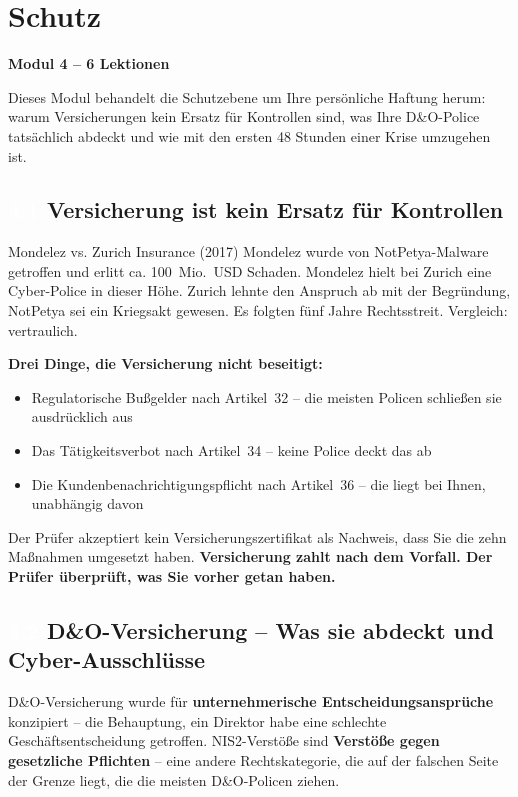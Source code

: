 \documentclass[11pt,a4paper,twoside]{book}
\newcommand{\lessontag}[1]{%
  \texorpdfstring{%
    \setlength{\fboxsep}{3pt}\colorbox{nisd2blue}{\textcolor{white}{\footnotesize\bfseries #1}}\quad%
  }{Lektion #1\ }%
}
\begin{document}
\chapter{Schutz}

\begin{moduleintro}
\textbf{Modul 4 -- 6 Lektionen}

Dieses Modul behandelt die Schutzebene um Ihre persönliche Haftung herum: warum Versicherungen kein Ersatz für Kontrollen sind, was Ihre D\&O-Police tatsächlich abdeckt und wie mit den ersten 48 Stunden einer Krise umzugehen ist.
\end{moduleintro}

\section{\lessontag{4.1}Versicherung ist kein Ersatz für Kontrollen}

\begin{casestudy}{Mondelez vs. Zurich Insurance (2017)}
Mondelez wurde von NotPetya-Malware getroffen und erlitt ca. 100~Mio.~USD Schaden. Mondelez hielt bei Zurich eine Cyber-Police in dieser Höhe. Zurich lehnte den Anspruch ab mit der Begründung, NotPetya sei ein Kriegsakt gewesen. Es folgten fünf Jahre Rechtsstreit. Vergleich: vertraulich.
\end{casestudy}

\textbf{Drei Dinge, die Versicherung nicht beseitigt:}
\begin{itemize}
  \item Regulatorische Bußgelder nach Artikel~32 -- die meisten Policen schließen sie ausdrücklich aus
  \item Das Tätigkeitsverbot nach Artikel~34 -- keine Police deckt das ab
  \item Die Kundenbenachrichtigungspflicht nach Artikel~36 -- die liegt bei Ihnen, unabhängig davon
\end{itemize}

Der Prüfer akzeptiert kein Versicherungszertifikat als Nachweis, dass Sie die zehn Maßnahmen umgesetzt haben. \textbf{Versicherung zahlt nach dem Vorfall. Der Prüfer überprüft, was Sie vorher getan haben.}

\section{\lessontag{4.2}D\&O-Versicherung -- Was sie abdeckt und Cyber-Ausschlüsse}

D\&O-Versicherung wurde für \textbf{unternehmerische Entscheidungsansprüche} konzipiert -- die Behauptung, ein Direktor habe eine schlechte Geschäftsentscheidung getroffen. NIS2-Verstöße sind \textbf{Verstöße gegen gesetzliche Pflichten} -- eine andere Rechtskategorie, die auf der falschen Seite der Grenze liegt, die die meisten D\&O-Policen ziehen.
\end{document}
